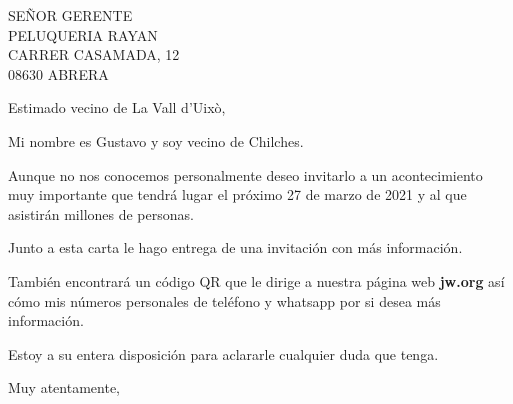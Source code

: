 \documentclass{scrlttr2}
\begin{document}
\begin{letter}{%
SEÑOR GERENTE\\
PELUQUERIA RAYAN\\
CARRER CASAMADA, 12\\
08630 ABRERA\\
}
\opening{Estimado vecino de La Vall d'Uixò,}



Mi nombre es Gustavo y soy vecino de Chilches. 

Aunque no nos conocemos personalmente deseo invitarlo a un acontecimiento muy importante que tendrá lugar el próximo 27 de marzo de 2021 y al que asistirán millones de personas.

Junto a esta carta le hago entrega de una invitación con más información.

También encontrará un código QR que le dirige a nuestra página web \textbf{jw.org} así cómo mis números personales de teléfono y whatsapp por si desea más información.

Estoy a su entera disposición para aclararle cualquier duda que tenga.
\closing{Muy atentamente,}




\end{letter}
\end{document}
